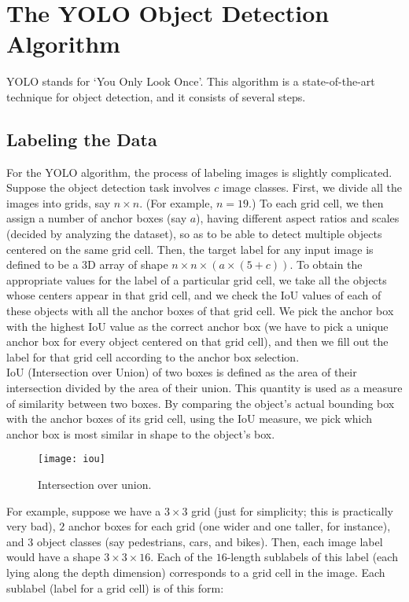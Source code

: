 \documentclass[a4paper, 12pt]{report}
\begin{document}
\section{The YOLO Object Detection Algorithm}
YOLO stands for `You Only Look Once'. This algorithm is a state-of-the-art technique for object detection, and it consists of several steps.

\subsection{Labeling the Data}
For the YOLO algorithm, the process of labeling images is slightly complicated.\\
\break
Suppose the object detection task involves $c$ image classes. First, we divide all the images into grids, say $n\times n$. (For example, $n=19$.) To each grid cell, we then assign a number of anchor boxes (say $a$), having different aspect ratios and scales (decided by analyzing the dataset), so as to be able to detect multiple objects centered on the same grid cell. Then, the target label for any input image is defined to be a 3D array of shape $n\times n\times (a\times (5+c))$. To obtain the appropriate values for the label of a particular grid cell, we take all the objects whose centers appear in that grid cell, and we check the IoU values of each of these objects with all the anchor boxes of that grid cell. We pick the anchor box with the highest IoU value as the correct anchor box (we have to pick a unique anchor box for every object centered on that grid cell), and then we fill out the label for that grid cell according to the anchor box selection.\\
\break
IoU (Intersection over Union) of two boxes is defined as the area of their intersection divided by the area of their union. This quantity is used as a measure of similarity between two boxes. By comparing the object's actual bounding box with the anchor boxes of its grid cell, using the IoU measure, we pick which anchor box is most similar in shape to the object's box.
\begin{figure}[H]
\centering
\texttt{[image: iou]}
\caption{Intersection over union.}
\end{figure}
For example, suppose we have a $3\times 3$ grid (just for simplicity; this is practically very bad), $2$ anchor boxes for each grid (one wider and one taller, for instance), and $3$ object classes (say pedestrians, cars, and bikes). Then, each image label would have a shape $3\times 3\times 16$. Each of the $16$-length sublabels of this label (each lying along the depth dimension) corresponds to a grid cell in the image. Each sublabel (label for a grid cell) is of this form:
\end{document}
